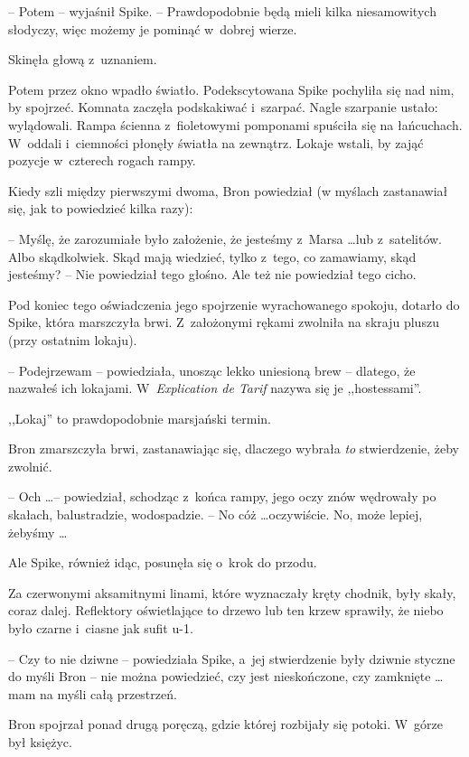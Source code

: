 \documentclass[oneside,polish,11pt,rmheadings]{mwbk}
\begin{document}
-- Potem -- wyjaśnił Spike. -- Prawdopodobnie będą mieli kilka niesamowitych słodyczy, więc możemy je pominąć w~dobrej wierze. 

Skinęła głową z~uznaniem. 

Potem przez okno wpadło światło. Podekscytowana Spike pochyliła się nad nim, by spojrzeć. Komnata zaczęła podskakiwać i~szarpać. Nagle szarpanie ustało: wylądowali. Rampa ścienna z~fioletowymi pomponami spuściła się na łańcuchach. W~oddali i~ciemności płonęły światła na zewnątrz. Lokaje wstali, by zająć pozycje w~czterech rogach rampy. 

Kiedy szli między pierwszymi dwoma, Bron powiedział (w myślach zastanawiał się, jak to powiedzieć kilka razy): 

-- Myślę, że zarozumiałe było założenie, że jesteśmy z~Marsa \ldots  lub z~satelitów. Albo skądkolwiek. Skąd mają wiedzieć, tylko z~tego, co zamawiamy, skąd jesteśmy? -- Nie powiedział tego głośno. Ale też nie powiedział tego cicho. 

Pod koniec tego oświadczenia jego spojrzenie wyrachowanego spokoju, dotarło do Spike, która marszczyła brwi. Z~założonymi rękami zwolniła na skraju pluszu (przy ostatnim lokaju). 

-- Podejrzewam -- powiedziała, unosząc lekko uniesioną brew -- dlatego, że nazwałeś ich lokajami. W~\textit{Explication de Tarif } nazywa się je ,,hostessami''. 

,,Lokaj'' to prawdopodobnie marsjański termin. 

Bron zmarszczyła brwi, zastanawiając się, dlaczego wybrała \textit{to }stwierdzenie, żeby zwolnić. 

-- Och \ldots  -- powiedział, schodząc z~końca rampy, jego oczy znów wędrowały po skałach, balustradzie, wodospadzie. -- No cóż \ldots  oczywiście. No, może lepiej, żebyśmy \ldots  

Ale Spike, również idąc, posunęła się o~krok do przodu. 

Za czerwonymi aksamitnymi linami, które wyznaczały kręty chodnik, były skały, coraz dalej. Reflektory oświetlające to drzewo lub ten krzew sprawiły, że niebo było czarne i~ciasne jak sufit u-1. 

-- Czy to nie dziwne -- powiedziała Spike, a~jej stwierdzenie były dziwnie styczne do myśli Bron -- nie można powiedzieć, czy jest nieskończone, czy zamknięte \ldots  mam na myśli całą przestrzeń. 

Bron spojrzał ponad drugą poręczą, gdzie której rozbijały się potoki. W~górze był księżyc. 
\end{document}
